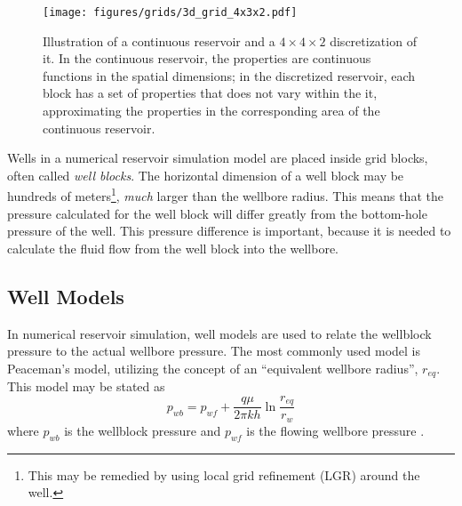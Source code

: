 \begin{figure}[htbp]
    \centering
    \texttt{[image: figures/grids/3d\_grid\_4x3x2.pdf]}
    \caption{Illustration of a continuous reservoir and a $4\times 4\times 2$ discretization of it. In the continuous reservoir, the properties are continuous functions in the spatial dimensions; in the discretized reservoir, each block has a set of properties that does not vary within the it, approximating the properties in the corresponding area of the continuous reservoir.}
    \label{fig:grid-discretization}
\end{figure}


Wells in a numerical reservoir simulation model are placed inside grid blocks, often called \emph{well blocks}. The horizontal dimension of a well block may be hundreds of meters\footnote{This may be remedied by using local grid refinement (LGR) around the well.}, \emph{much} larger than the wellbore radius. This means that the pressure calculated for the well block will differ greatly from the bottom-hole pressure of the well. This pressure difference is important, because it is needed to calculate the fluid flow  from the well block into the wellbore.

\subsection{Well Models} %
\label{sub:well_models}
In numerical reservoir simulation, well models are used to relate the wellblock pressure to the actual wellbore pressure. The most commonly used model is Peaceman's model, utilizing the concept of an ``equivalent wellbore radius'', $r_{eq}$. This model may be stated as
\begin{equation}
    \label{eq:intro-well-model}
    p_{wb} = p_{wf} + \frac{q\mu}{2\pi k h} \ln \frac{r_{eq}}{r_{w}}
\end{equation}
where $p_{wb}$ is the wellblock pressure and $p_{wf}$ is the flowing wellbore pressure \cite{Peaceman1990Interpretation}.

